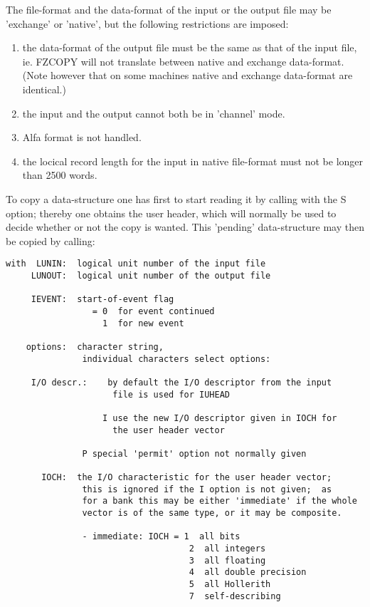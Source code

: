 {The file-format and the data-format of the input or the output file
may be 'exchange' or 'native', but the following restrictions are
imposed:
\begin{enumerate}
   \item the data-format of the output file must be the same as that
      of the input file, ie. FZCOPY will not translate between
      native and exchange data-format. (Note however that on some
      machines native and exchange data-format are identical.)
   \item the input and the output cannot both be in 'channel' mode.
   \item Alfa format is not handled.
   \item the locical record length for the input in native file-format
      must not be longer than 2500 words.
\end{enumerate}

To copy a data-structure one has first to start reading it by calling
 with the S option; thereby one obtains the user header,
which will normally be used to decide whether or not the copy is
wanted. This 'pending' data-structure may then be copied by
calling:

\begin{verbatim}
with  LUNIN:  logical unit number of the input file
     LUNOUT:  logical unit number of the output file

     IEVENT:  start-of-event flag
                 = 0  for event continued
                   1  for new event

    options:  character string,
               individual characters select options:

     I/O descr.:    by default the I/O descriptor from the input
                     file is used for IUHEAD

                   I use the new I/O descriptor given in IOCH for
                     the user header vector

               P special 'permit' option not normally given

       IOCH:  the I/O characteristic for the user header vector;
               this is ignored if the I option is not given;  as
               for a bank this may be either 'immediate' if the whole
               vector is of the same type, or it may be composite.

               - immediate: IOCH = 1  all bits
                                    2  all integers
                                    3  all floating
                                    4  all double precision
                                    5  all Hollerith
                                    7  self-describing


\end{verbatim}}
